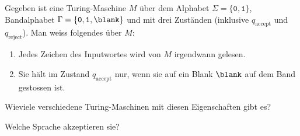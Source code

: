 Gegeben ist eine Turing-Maschine $M$ über dem Alphabet
$\Sigma=\{\texttt{0}, \texttt{1}\}$,
Bandalphabet
$\Gamma=\{\texttt{0}, \texttt{1}, \blank\}$
und mit drei Zuständen
(inklusive $q_{\text{accept}}$ und $q_{\text{reject}}$).
Man weiss folgendes über $M$:
\begin{enumerate}
\item\label{50000019:liestalles} Jedes Zeichen des Inputwortes wird
von $M$ irgendwann gelesen.
\item\label{50000019:haeltaufblank} Sie hält im Zustand $q_{\text{accept}}$
nur, wenn sie auf ein Blank $\blank$ auf dem Band gestossen ist.
\end{enumerate}
\begin{teilaufgaben}
\item
Wieviele verschiedene Turing-Maschinen mit diesen Eigenschaften gibt es?
\item
Welche Sprache akzeptieren sie?
\end{teilaufgaben}


